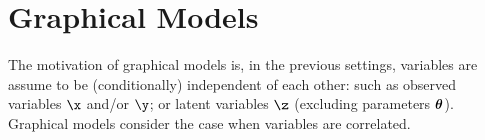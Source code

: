 \section{Graphical Models}
The motivation of graphical models is, in the previous settings, variables are assume to be (conditionally) independent of each other: such as observed variables $\x$ and/or $\y$; or latent variables $\z$ (excluding parameters ${\boldsymbol{\theta}}$). Graphical models consider the case when variables are correlated. 